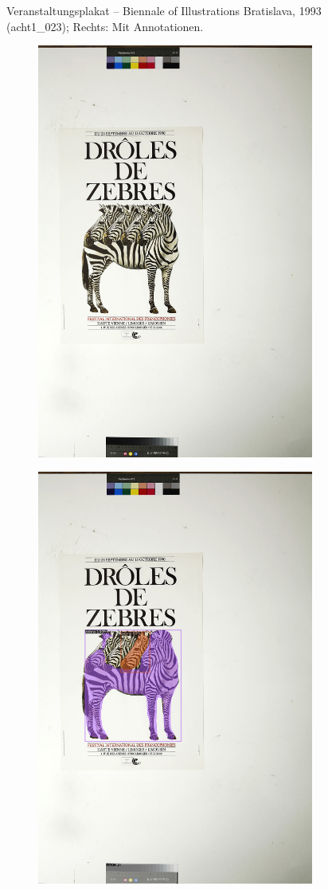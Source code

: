\documentclass[a4paper,12pt,ngerman]{article}
\begin{document}
\begin{landscape}
\begin{figure}[ht]
\begin{subfigure}[b]{0.5\linewidth}
	\end{subfigure}
	\caption{Veranstaltungsplakat -- Biennale of Illustrations Bratislava, 1993 (acht1\_023); Rechts: Mit Annotationen.}
\end{figure}
\end{landscape}

\newpage
\begin{landscape}
\begin{figure}[ht]
	\begin{subfigure}[b]{0.5\linewidth}
	\centering
	\includegraphics[height=\linewidth]{Abbildung_31_(acht1_016)}
	\end{subfigure}
	\begin{subfigure}[b]{0.5\linewidth}
	\centering
	\includegraphics[height=\linewidth]{Abbildung_31_(acht1_016)_with_detections}

\end{subfigure}
\end{figure}
\end{landscape}
\end{document}
